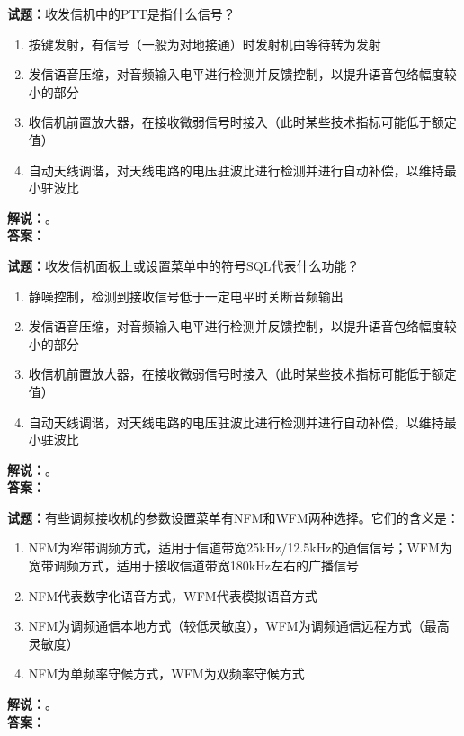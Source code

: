 \documentclass{ctexbook}
\begin{document}
\bigskip

\noindent\textbf{试题：}收发信机中的PTT是指什么信号？
\begin{enumerate}[leftmargin=3em]
  \item 按键发射，有信号（一般为对地接通）时发射机由等待转为发射
  \item 发信语音压缩，对音频输入电平进行检测并反馈控制，以提升语音包络幅度较小的部分
  \item 收信机前置放大器，在接收微弱信号时接入（此时某些技术指标可能低于额定值）
  \item 自动天线调谐，对天线电路的电压驻波比进行检测并进行自动补偿，以维持最小驻波比
\end{enumerate}
\noindent\textbf{解说：}\textbf{}。\\\noindent\textbf{答案：}

\bigskip

\noindent\textbf{试题：}收发信机面板上或设置菜单中的符号SQL代表什么功能？
\begin{enumerate}[leftmargin=3em]
  \item 静噪控制，检测到接收信号低于一定电平时关断音频输出
  \item 发信语音压缩，对音频输入电平进行检测并反馈控制，以提升语音包络幅度较小的部分
  \item 收信机前置放大器，在接收微弱信号时接入（此时某些技术指标可能低于额定值）
  \item 自动天线调谐，对天线电路的电压驻波比进行检测并进行自动补偿，以维持最小驻波比
\end{enumerate}
\noindent\textbf{解说：}\textbf{}。\\\noindent\textbf{答案：}

\bigskip

\noindent\textbf{试题：}有些调频接收机的参数设置菜单有NFM和WFM两种选择。它们的含义是：
\begin{enumerate}[leftmargin=3em]
  \item NFM为窄带调频方式，适用于信道带宽25\unit{\kHz}/12.5\unit{\kHz}的通信信号；WFM为宽带调频方式，适用于接收信道带宽180\unit{\kHz}左右的广播信号
  \item NFM代表数字化语音方式，WFM代表模拟语音方式
  \item NFM为调频通信本地方式（较低灵敏度），WFM为调频通信远程方式（最高灵敏度）
  \item NFM为单频率守候方式，WFM为双频率守候方式
\end{enumerate}
\noindent\textbf{解说：}\textbf{}。\\\noindent\textbf{答案：}
\end{document}

